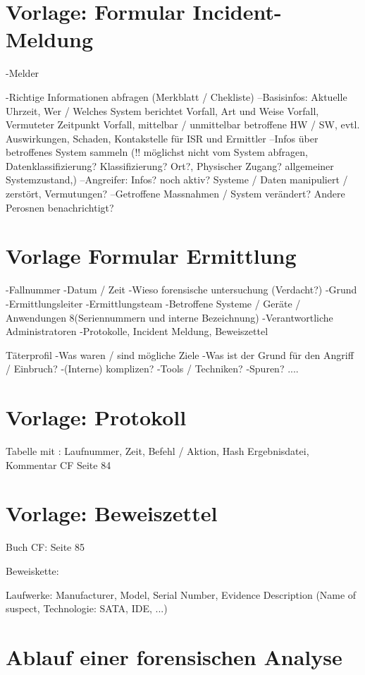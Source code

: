 
%



\chapter{Vorlage: Formular Incident-Meldung} \label{appx:Template:IncidentMessage}
-Melder

-Richtige Informationen abfragen (Merkblatt / Chekliste)
--Basisinfos: Aktuelle Uhrzeit, Wer / Welches System berichtet Vorfall, Art und Weise Vorfall, Vermuteter Zeitpunkt Vorfall, mittelbar / unmittelbar betroffene HW / SW, evtl. Auswirkungen, Schaden, Kontakstelle für ISR und Ermittler
--Infos über betroffenes System sammeln (!! möglichst nicht vom System abfragen, Datenklassifizierung? Klassifizierung? Ort?, Physischer Zugang?  allgemeiner Systemzustand,)
--Angreifer: Infos? noch aktiv? Systeme / Daten manipuliert / zerstört, Vermutungen?
--Getroffene Massnahmen / System verändert? Andere Perosnen benachrichtigt?

\chapter{Vorlage Formular Ermittlung}
-Fallnummer
-Datum / Zeit
-Wieso forensische untersuchung (Verdacht?)
-Grund
-Ermittlungsleiter
-Ermittlungsteam
-Betroffene Systeme / Geräte / Anwendungen 8(Seriennummern und interne Bezeichnung)
-Verantwortliche Administratoren
-Protokolle, Incident Meldung, Beweiszettel

Täterprofil
-Was waren / sind mögliche Ziele
-Was ist der Grund für den Angriff / Einbruch?
-(Interne) komplizen?
-Tools / Techniken?
-Spuren?
....
\chapter{Vorlage: Protokoll}


Tabelle mit : Laufnummer, Zeit, Befehl / Aktion, Hash Ergebnisdatei, Kommentar
CF Seite 84

\chapter{Vorlage: Beweiszettel} \label{appx:Template:ProofPaper}
Buch CF: Seite 85

Beweiskette:

Laufwerke: Manufacturer, Model, Serial Number, Evidence Description (Name of suspect, Technologie: SATA, IDE, ...)





\chapter{Ablauf einer forensischen Analyse}
